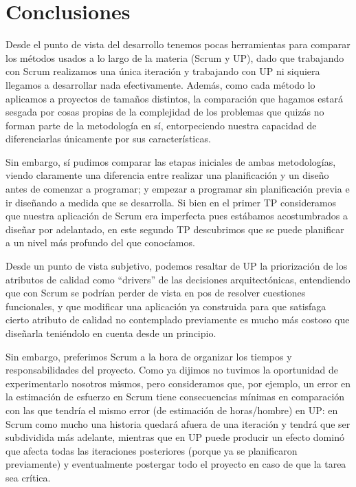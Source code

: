 \documentclass[a4paper, 10pt, twoside]{article}
\begin{document}
\section{Conclusiones}

Desde el punto de vista del desarrollo tenemos pocas herramientas para comparar los métodos usados a lo largo de la materia (Scrum y UP),
dado que trabajando con Scrum realizamos una única iteración y trabajando con UP ni siquiera llegamos a desarrollar nada efectivamente.
Además, como cada método lo aplicamos a proyectos de tamaños distintos, la comparación que hagamos estará sesgada por cosas propias de la
complejidad de los problemas que quizás no forman parte de la metodología en sí, entorpeciendo nuestra capacidad de diferenciarlas únicamente
por sus características.

Sin embargo, sí pudimos comparar las etapas iniciales de ambas metodologías, viendo claramente una diferencia entre realizar una planificación
y un diseño antes de comenzar a programar; y empezar a programar sin planificación previa e ir diseñando a medida que se desarrolla. Si bien
en el primer TP consideramos que nuestra aplicación de Scrum era imperfecta pues estábamos acostumbrados a diseñar por adelantado,
en este segundo TP descubrimos que se puede planificar a un nivel más profundo del que conocíamos.

Desde un punto de vista subjetivo, podemos resaltar de UP la priorización de los atributos de calidad como ``drivers'' de las decisiones arquitectónicas,
entendiendo que con Scrum se podrían perder de vista en pos de resolver cuestiones funcionales, y que modificar una aplicación ya construida para que
satisfaga cierto atributo de calidad no contemplado previamente es mucho más costoso que diseñarla teniéndolo en cuenta desde un principio.

Sin embargo, preferimos Scrum a la hora de organizar los tiempos y responsabilidades del proyecto. Como ya dijimos no tuvimos la oportunidad de
experimentarlo nosotros mismos, pero consideramos que, por ejemplo, un error en la estimación de esfuerzo en Scrum tiene consecuencias mínimas
en comparación con las que tendría el mismo error (de estimación de horas/hombre) en UP: en Scrum como mucho una historia quedará afuera de una iteración y
tendrá que ser subdividida más adelante, mientras que en UP puede producir un efecto dominó que afecta todas las iteraciones posteriores
(porque ya se planificaron previamente) y eventualmente postergar todo el proyecto en caso de que la tarea sea crítica.
\end{document}
